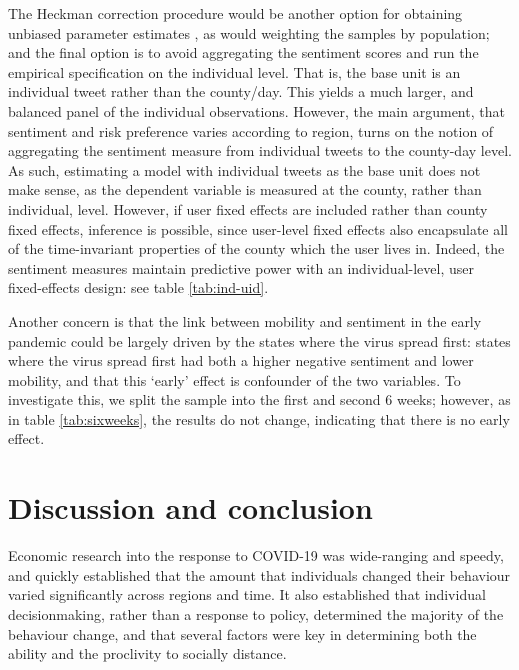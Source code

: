 \documentclass{article}
\begin{document}
The Heckman correction procedure would be another option for obtaining unbiased parameter estimates \parencite{wooldridgeSelectionCorrectionsPanel1995}, as would weighting the samples by population; and the final option is to avoid aggregating the sentiment scores and run the empirical specification on the individual level. That is, the base unit is an individual tweet rather than the county/day. This yields a much larger, and balanced panel of the individual observations. However, the main argument, that sentiment and risk preference varies according to region, turns on the notion of aggregating the sentiment measure from individual tweets to the county-day level. As such, estimating a model with individual tweets as the base unit does not make sense, as the dependent variable is measured at the county, rather than individual, level. However, if user fixed effects are included rather than county fixed effects, inference is possible, since user-level fixed effects also encapsulate all of the time-invariant properties of the county which the user lives in. Indeed, the sentiment measures maintain predictive power with an individual-level, user fixed-effects design: see table \ref{tab:ind-uid}.

Another concern is that the link between mobility and sentiment in the early pandemic could be largely driven by the states where the virus spread first: states where the virus spread first had both a higher negative sentiment and lower mobility, and that this `early' effect is confounder of the two variables. To investigate this, we split the sample into the first and second 6 weeks; however, as in table \ref{tab:sixweeks}, the results do not change, indicating that there is no early effect.

\section{Discussion and conclusion} 
Economic research into the response to COVID-19 was wide-ranging and speedy, and quickly established that the amount that individuals changed their behaviour varied significantly across regions and time. It also established that individual decisionmaking, rather than a response to policy, determined the majority of the behaviour change, and that several factors were key in determining both the ability and the proclivity to socially distance. 
\end{document}
